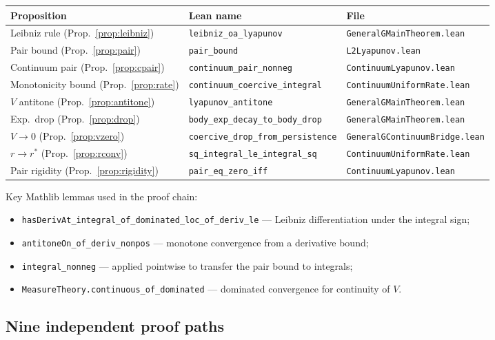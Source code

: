 \documentclass[11pt,a4paper]{article}
\theoremstyle{definition}
\begin{document}
\medskip
\begin{center}
\begin{tabular}{lll}
\textbf{Proposition} & \textbf{Lean name} & \textbf{File} \\
\hline
Leibniz rule (Prop.~\ref{prop:leibniz}) & \texttt{leibniz\_oa\_lyapunov} & \texttt{GeneralGMainTheorem.lean} \\
Pair bound (Prop.~\ref{prop:pair}) & \texttt{pair\_bound} & \texttt{L2Lyapunov.lean} \\
Continuum pair (Prop.~\ref{prop:cpair}) & \texttt{continuum\_pair\_nonneg} & \texttt{ContinuumLyapunov.lean} \\
Monotonicity bound (Prop.~\ref{prop:rate}) & \texttt{continuum\_coercive\_integral} & \texttt{ContinuumUniformRate.lean} \\
$V$ antitone (Prop.~\ref{prop:antitone}) & \texttt{lyapunov\_antitone} & \texttt{GeneralGMainTheorem.lean} \\
Exp.\ drop (Prop.~\ref{prop:drop}) & \texttt{body\_exp\_decay\_to\_body\_drop} & \texttt{GeneralGMainTheorem.lean} \\
$V \to 0$ (Prop.~\ref{prop:vzero}) & \texttt{coercive\_drop\_from\_persistence} & \texttt{GeneralGContinuumBridge.lean} \\
$r \to r^*$ (Prop.~\ref{prop:rconv}) & \texttt{sq\_integral\_le\_integral\_sq} & \texttt{ContinuumUniformRate.lean} \\
Pair rigidity (Prop.~\ref{prop:rigidity}) & \texttt{pair\_eq\_zero\_iff} & \texttt{ContinuumLyapunov.lean}
\end{tabular}
\end{center}

\medskip\noindent Key Mathlib lemmas used in the proof chain:
\begin{itemize}
\item \texttt{hasDerivAt\_integral\_of\_dominated\_loc\_of\_deriv\_le} --- Leibniz differentiation under the integral sign;
\item \texttt{antitoneOn\_of\_deriv\_nonpos} --- monotone convergence from a derivative bound;
\item \texttt{integral\_nonneg} --- applied pointwise to transfer the pair bound to integrals;
\item \texttt{MeasureTheory.continuous\_of\_dominated} --- dominated convergence for continuity of $V$.
\end{itemize}

\subsection{Nine independent proof paths}
\end{document}
